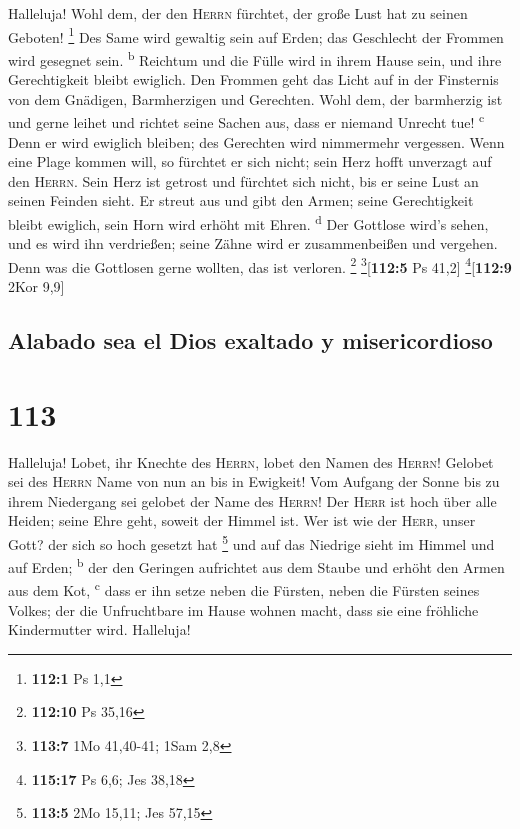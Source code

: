  Halleluja! Wohl dem, der den \textsc{Herrn} fürchtet, der
große Lust hat zu seinen Geboten! \footnote{\textbf{112:1} Ps 1,1}
 Des Same wird gewaltig sein auf Erden; das Geschlecht der
Frommen wird gesegnet sein. \textsuperscript{b}  Reichtum
und die Fülle wird in ihrem Hause sein, und ihre Gerechtigkeit bleibt
ewiglich.  Den Frommen geht das Licht auf in der
Finsternis von dem Gnädigen, Barmherzigen und Gerechten. 
Wohl dem, der barmherzig ist und gerne leihet und richtet seine Sachen
aus, dass er niemand Unrecht tue! \textsuperscript{c} 
Denn er wird ewiglich bleiben; des Gerechten wird nimmermehr vergessen.
 Wenn eine Plage kommen will, so fürchtet er sich nicht;
sein Herz hofft unverzagt auf den \textsc{Herrn}.  Sein
Herz ist getrost und fürchtet sich nicht, bis er seine Lust an seinen
Feinden sieht.  Er streut aus und gibt den Armen; seine
Gerechtigkeit bleibt ewiglich, sein Horn wird erhöht mit Ehren.
\textsuperscript{d}  Der Gottlose wird's sehen, und es
wird ihn verdrießen; seine Zähne wird er zusammenbeißen und vergehen.
Denn was die Gottlosen gerne wollten, das ist verloren. \footnote{\textbf{112:10}
  Ps 35,16} \footnote{\textbf{113:7} 1Mo 41,40-41; 1Sam 2,8}{[}\textbf{112:5}
Ps 41,2{]} \footnote{\textbf{115:17} Ps 6,6; Jes 38,18}{[}\textbf{112:9}
2Kor 9,9{]}

\hypertarget{alabado-sea-el-dios-exaltado-y-misericordioso}{%
\subsection{Alabado sea el Dios exaltado y
misericordioso}\label{alabado-sea-el-dios-exaltado-y-misericordioso}}

\hypertarget{section-112}{%
\section{113}\label{section-112}}

 Halleluja! Lobet, ihr Knechte des \textsc{Herrn}, lobet
den Namen des \textsc{Herrn}!  Gelobet sei des
\textsc{Herrn} Name von nun an bis in Ewigkeit!  Vom
Aufgang der Sonne bis zu ihrem Niedergang sei gelobet der Name des
\textsc{Herrn}!  Der \textsc{Herr} ist hoch über alle
Heiden; seine Ehre geht, soweit der Himmel ist.  Wer ist
wie der \textsc{Herr}, unser Gott? der sich so hoch gesetzt hat
\footnote{\textbf{113:5} 2Mo 15,11; Jes 57,15}  und auf
das Niedrige sieht im Himmel und auf Erden; \textsuperscript{b}
 der den Geringen aufrichtet aus dem Staube und erhöht den
Armen aus dem Kot, \textsuperscript{c}  dass er ihn setze
neben die Fürsten, neben die Fürsten seines Volkes;  der
die Unfruchtbare im Hause wohnen macht, dass sie eine fröhliche
Kindermutter wird. Halleluja!

